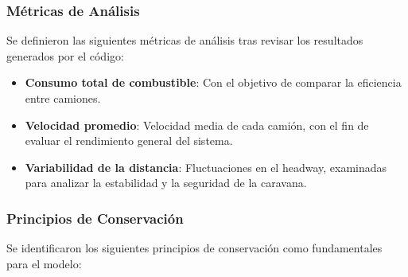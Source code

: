 \documentclass[11pt,stdletter,orderfromtodate,sigleft,twoside]{report}
\begin{document}
\subsubsection{Métricas de Análisis}

Se definieron las siguientes métricas de análisis tras revisar los resultados generados por el código:

\begin{itemize}
    \item \textbf{Consumo total de combustible}: Con el objetivo de comparar la eficiencia entre camiones.
    \item \textbf{Velocidad promedio}: Velocidad media de cada camión, con el fin de evaluar el rendimiento general del sistema.
    \item \textbf{Variabilidad de la distancia}: Fluctuaciones en el headway, examinadas para analizar la estabilidad y la seguridad de la caravana.
\end{itemize}

\subsubsection{Principios de Conservación}

Se identificaron los siguientes principios de conservación como fundamentales para el modelo:
\end{document}

